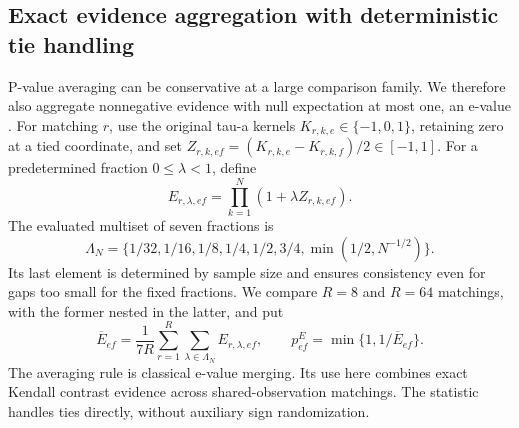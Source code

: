 \subsection{Exact evidence aggregation with deterministic tie handling}\label{sec:evalues}
P-value averaging can be conservative at a large comparison family. We therefore also aggregate nonnegative evidence with null expectation at most one, an e-value \citep{vovk2021}. For matching $r$, use the original tau-a kernels $K_{r,k,e}\in\{-1,0,1\}$, retaining zero at a tied coordinate, and set $Z_{r,k,ef}=(K_{r,k,e}-K_{r,k,f})/2\in[-1,1]$. For a predetermined fraction $0\le\lambda<1$, define
\[
 E_{r,\lambda,ef}=\prod_{k=1}^N(1+\lambda Z_{r,k,ef}).
\]
The evaluated multiset of seven fractions is
\[
 \Lambda_N=\{1/32,1/16,1/8,1/4,1/2,3/4,\min(1/2,N^{-1/2})\}.
\]
Its last element is determined by sample size and ensures consistency even for gaps too small for the fixed fractions. We compare $R=8$ and $R=64$ matchings, with the former nested in the latter, and put
\begin{equation}\label{eq:evalue}
 \overline E_{ef}=\frac1{7R}\sum_{r=1}^R\sum_{\lambda\in\Lambda_N}E_{r,\lambda,ef},\qquad
 p^E_{ef}=\min\{1,1/\overline E_{ef}\}.
\end{equation}
The averaging rule is classical e-value merging. Its use here combines exact Kendall contrast evidence across shared-observation matchings. The statistic handles ties directly, without auxiliary sign randomization.

